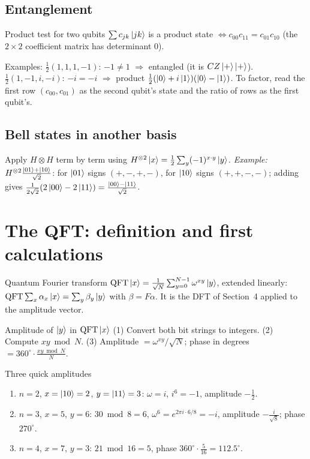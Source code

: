 \documentclass[11pt,a4paper,openany]{book}
\newcounter{wex}[chapter]
\newcommand{\QFT}{\mathrm{QFT}}
\begin{document}
\subsection{Entanglement}
\begin{keyres}{Product test for two qubits}
$\sum c_{jk}\ket{jk}$ is a product state $\iff c_{00}c_{11} = c_{01}c_{10}$ (the $2\times2$ coefficient matrix has determinant 0).
\end{keyres}
Examples: $\frac12(1, 1, 1, -1)$: $-1 \ne 1$ $\Rightarrow$ entangled (it is $CZ\ket+\ket+$). $\frac12(1, -1, i, -i)$: $-i = -i$ $\Rightarrow$ product
$\frac12(\ket0 + i\ket1)(\ket0 - \ket1)$. To factor, read the first row $(c_{00}, c_{01})$ as the second qubit's state and the
ratio of rows as the first qubit's.

\subsection{Bell states in another basis}
Apply $H\otimes H$ term by term using $H^{\otimes2}\ket{x} = \frac12\sum_y(-1)^{x\cdot y}\ket y$. \emph{Example:}
$H^{\otimes 2}\frac{\ket{01} + \ket{10}}{\sqrt2}$: for $\ket{01}$ signs $(+,-,+,-)$, for $\ket{10}$ signs $(+,+,-,-)$; adding gives
$\frac{1}{2\sqrt2}(2\ket{00} - 2\ket{11}) = \frac{\ket{00} - \ket{11}}{\sqrt2}$.

\section{The QFT: definition and first calculations}
\begin{defn}{Quantum Fourier transform}
$\QFT\ket{x} = \frac{1}{\sqrt N}\sum_{y=0}^{N-1}\omega^{xy}\ket y$, extended linearly: $\QFT\sum_x\alpha_x\ket x = \sum_y\beta_y\ket y$ with $\beta = F\alpha$.
It is the DFT of Section~4 applied to the amplitude vector.
\end{defn}

\begin{method}{Amplitude of $\ket y$ in $\QFT\ket x$}
(1) Convert both bit strings to integers. (2) Compute $xy \bmod N$. (3) Amplitude $= \omega^{xy}/\sqrt N$; phase in degrees
$= 360^\circ\cdot\frac{xy \bmod N}{N}$.
\end{method}

\begin{wexample}{Three quick amplitudes}
\begin{enumerate}[itemsep=1pt]
\item $n = 2$, $x = \ket{10} = 2$, $y = \ket{11} = 3$: $\omega = i$, $i^{6} = -1$, amplitude $-\frac12$.
\item $n = 3$, $x = 5$, $y = 6$: $30 \bmod 8 = 6$, $\omega^6 = e^{2\pi i\cdot 6/8} = -i$, amplitude $-\frac{i}{\sqrt8}$; phase $270^\circ$.
\item $n = 4$, $x = 7$, $y = 3$: $21 \bmod 16 = 5$, phase $360^\circ\cdot\frac{5}{16} = 112.5^\circ$.
\end{enumerate}
\end{wexample}
\end{document}
